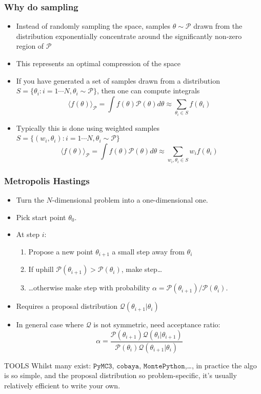\documentclass[aspectratio=169]{beamer}
\begin{document}
\begin{frame}
    \frametitle{Why do sampling}
    \begin{itemize}
        \item Instead of randomly sampling the space, samples $\theta\sim\mathcal{P}$ drawn from the distribution exponentially concentrate around the significantly non-zero region of $\mathcal{P}$
        \item This represents an optimal compression of the space
        \item If you have generated a set of samples drawn from a distribution $S=\{\theta_i : i=1\cdots N,\theta_i\sim\mathcal{P}\}$, then one can compute integrals
            \[ \langle f(\theta) \rangle_\mathcal{P} = \int f(\theta) \mathcal{P}(\theta) d\theta \approx \sum_{\theta_i\in S} f(\theta_i) \]
        \item Typically this is done using weighted samples $S=\{(w_i, \theta_i) : i=1\cdots N,\theta_i\sim\mathcal{P}\}$
            \[ \langle f(\theta) \rangle_\mathcal{P} = \int f(\theta) \mathcal{P}(\theta) d\theta \approx \sum_{w_i, \theta_i\in S} w_i f(\theta_i) \]
    \end{itemize}
\end{frame}

\begin{frame}
    \frametitle{Metropolis Hastings} 
    \begin{itemize}
        \item Turn the $N$-dimensional problem into a one-dimensional one.
        \item Pick start point $\theta_0$.
        \item At step $i$:
            \begin{enumerate}
                \item Propose a new point $\theta_{i+1}$ a small step away from $\theta_{i}$
                \item If uphill $\mathcal{P}(\theta_{i+1}) > \mathcal{P}(\theta_i)$, make step\ldots
                \item \ldots otherwise make step with probability $\alpha = \mathcal{P}(\theta_{i+1}) / \mathcal{P}(\theta_i)$. 
            \end{enumerate}
        \item Requires a proposal distribution $\mathcal{Q}(\theta_{i+1}|\theta_i)$
        \item In general case where $\mathcal{Q}$ is not symmetric, need acceptance ratio:
            \begin{equation*}
                \alpha = \frac{\mathcal{P}(\theta_{i+1})\mathcal{Q}(\theta_{i}|\theta_{i+1})}{\mathcal{P}(\theta_{i})\mathcal{Q}(\theta_{i+1}|\theta_{i})}
            \end{equation*}
    \end{itemize}
    \begin{block}{TOOLS}
        Whilst many exist: $\texttt{PyMC3}$, $\texttt{cobaya}$, $\texttt{MontePython}$,\ldots, in practice the algo is so simple, and the proposal distribution so problem-specific, it's usually relatively efficient to write your own.
    \end{block}
\end{frame}
\end{document}
